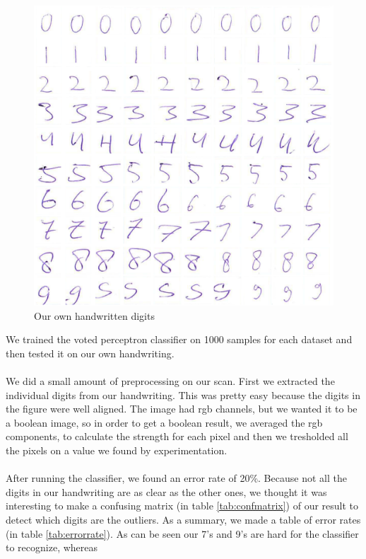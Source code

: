 \documentclass[%
        compressed,
        final,
        notitlepage,
        narroweqnarray,
        inline,
        twoside,
        ]{ieee}
\begin{document}
\begin{figure}
    \includegraphics[width=\columnwidth]{images/handwritten.png}
    \caption{Our own handwritten digits}
    \label{fig:handwritten}
\end{figure}
We trained the voted perceptron classifier on 1000 samples for each dataset and
then tested it on our own handwriting. \\\\
We did a small amount of preprocessing on our scan. First we extracted the
individual digits from our handwriting. This was pretty easy because the digits
in the figure were well aligned. The image had rgb channels, but we wanted it to
be a boolean image, so in order to get a boolean result, we averaged the rgb
components, to calculate the strength for each pixel and then we tresholded all the
pixels on a value we found by experimentation. \\\\
After running the classifier, we found an error rate of 20\%.
Because not all the digits in our handwriting are as clear as the other ones, we
thought it was interesting to make a confusing matrix (in table
\ref{tab:confmatrix}) of our result to detect which digits are the outliers.
As a summary, we made a table of error rates (in table \ref{tab:errorrate}).
As can be seen our 7's and 9's are hard for the classifier to recognize, whereas
\end{document}
